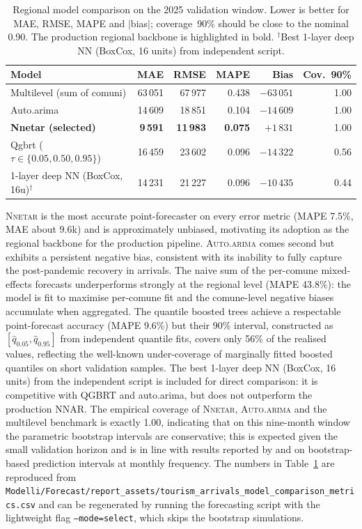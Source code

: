 \documentclass[11pt,a4paper]{article}
\begin{document}
\begin{table}[H]
\centering
\footnotesize
\setlength{\tabcolsep}{6pt}
\caption{Regional model comparison on the 2025 validation window. Lower is better for MAE, RMSE, MAPE and $|$bias$|$; coverage~90\% should be close to the nominal 0.90. The production regional backbone is highlighted in bold. $^\dagger$Best 1-layer deep NN (BoxCox, 16 units) from independent script.}
\label{tab:regional-model-comparison}
\begin{tabular}{lrrrrr}
\toprule
Model & MAE & RMSE & MAPE & Bias & Cov.\ 90\% \\
\midrule
Multilevel (sum of comuni)                  & 63\,051 & 67\,977 & 0.438 & $-63\,051$ & 1.00 \\
Auto.arima                                  & 14\,609 & 18\,851 & 0.104 & $-14\,609$ & 1.00 \\
\textbf{Nnetar (selected)}                  & \textbf{9\,591}  & \textbf{11\,983} & \textbf{0.075} & $+1\,831$  & 1.00 \\
Qgbrt ($\tau\in\{0.05,0.50,0.95\}$)         & 16\,459 & 23\,602 & 0.096 & $-14\,322$ & 0.56 \\
1-layer deep NN (BoxCox, 16u)$^\dagger$     & 14\,231 & 21\,227 & 0.096 & $-10\,435$ & 0.44 \\
\bottomrule
\end{tabular}
\end{table}

\textsc{Nnetar} is the most accurate point-forecaster on every error metric (MAPE 7.5\%, MAE about 9.6k) and is approximately unbiased, motivating its adoption as the regional backbone for the production pipeline. \textsc{Auto.arima} comes second but exhibits a persistent negative bias, consistent with its inability to fully capture the post-pandemic recovery in arrivals. The naive sum of the per-comune mixed-effects forecasts underperforms strongly at the regional level (MAPE 43.8\%): the model is fit to maximise per-comune fit and the comune-level negative biases accumulate when aggregated. The quantile boosted trees achieve a respectable point-forecast accuracy (MAPE 9.6\%) but their 90\% interval, constructed as $[\hat{q}_{0.05}, \hat{q}_{0.95}]$ from independent quantile fits, covers only 56\% of the realised values, reflecting the well-known under-coverage of marginally fitted boosted quantiles on short validation samples. The best 1-layer deep NN (BoxCox, 16 units) from the independent script is included for direct comparison: it is competitive with QGBRT and auto.arima, but does not outperform the production NNAR. The empirical coverage of \textsc{Nnetar}, \textsc{Auto.arima} and the multilevel benchmark is exactly 1.00, indicating that on this nine-month window the parametric bootstrap intervals are conservative; this is expected given the small validation horizon and is in line with results reported by \citet{hyndman2021} and \citet{bergmeir2016} on bootstrap-based prediction intervals at monthly frequency. The numbers in Table~\ref{tab:regional-model-comparison} are reproduced from \texttt{Modelli/Forecast/report\_assets/tourism\_arrivals\_model\_comparison\_metrics.csv} and can be regenerated by running the forecasting script with the lightweight flag \texttt{--mode=select}, which skips the bootstrap simulations.
\end{document}
